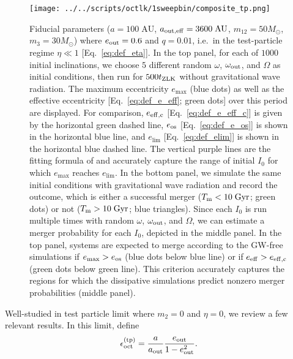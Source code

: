 \documentclass[
        fleqn,
        usenatbib,
    ]{mnras}
\newlength{\colummwidth}
\begin{document}
\begin{figure}
    \centering
    \texttt{[image: ../../scripts/octlk/1sweepbin/composite\_tp.png]}
    \caption{Fiducial parameters ($a = 100\;\mathrm{AU}$, $a_{\rm out, eff} =
    3600\;\mathrm{AU}$, $m_{12} = 50M_{\odot}$, $m_3 = 30M_{\odot}$) where
    $e_{\rm out} = 0.6$ and $q = 0.01$, i.e.\ in the test-particle regime
    $\eta \ll 1$ [Eq.~\eqref{eq:def_eta}]. In the top panel, for each of
    $1000$ initial inclinations, we choose $5$ different random $\omega$,
    $\omega_{\rm out}$, and $\Omega$ as initial conditions, then run for
    $500t_{\rm ZLK}$ without gravitational wave radiation. The
    maximum eccentricity $e_{\max}$ (blue dots) as well as the effective
    eccentricity [Eq.~\eqref{eq:def_e_eff}; green dots] over this period are
    displayed. For comparison, $e_{\rm eff, c}$ [Eq.~\eqref{eq:def_e_eff_c}] is
    given by the horizontal green dashed line, $e_{\rm os}$
    [Eq.~\eqref{eq:def_e_os}] is shown in the horizontal blue line, and
    $e_{\lim}$ [Eq.~\eqref{eq:def_elim}] is shown in the horizontal blue dashed
    line. The vertical purple lines are the fitting formula of
    \citet{MLL16} and accurately capture the range of initial $I_0$ for which
    $e_{\max}$ reaches $e_{\lim}$. In the bottom panel, we simulate the same
    initial conditions with gravitational wave radiation and record the
    outcome, which is either a successful merger ($T_{\rm m} <
    10\;\mathrm{Gyr}$; green dots) or not ($T_{\rm m} > 10\;\mathrm{Gyr}$; blue
    triangles). Since each $I_0$ is run multiple times with random $\omega$,
    $\omega_{\rm out}$, and $\Omega$, we can estimate a merger probability for
    each $I_0$, depicted in the middle panel. In the top panel, systems are
    expected to merge according to the GW-free simulations if $e_{\max} >
    e_{\rm os}$ (blue dots below blue line) or if $e_{\rm eff} > e_{\rm eff,
    c}$ (green dots below green line). This criterion accurately captures the
    regions for which the dissipative simulations predict nonzero merger
    probabilities (middle panel).
    }\label{fig:composites_tp}
\end{figure}

Well-studied in test particle limit where $m_2 = 0$ and $\eta = 0$, we review a
few relevant results. In this limit, define
\begin{equation}
    \epsilon_{\rm oct}^{\rm (tp)} = \frac{a}{a_{\rm
        out}} \frac{e_{\rm out}}{1 - e_{\rm out}^2}.\label{eq:eps_oct_tp}
\end{equation}
\end{document}
